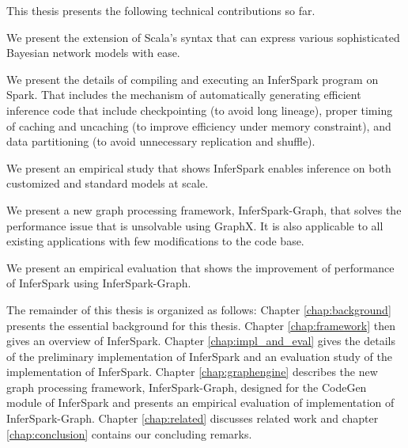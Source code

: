 This thesis presents the following technical contributions so far.
\begin{packed_enum}
\item We present the extension of Scala's syntax that can express various
	sophisticated Bayesian network models with ease.
\item We present the details of compiling and executing an InferSpark program
	on Spark.  That includes the mechanism of automatically generating efficient
	inference code that include checkpointing (to avoid long lineage), proper
	timing of caching and uncaching (to improve efficiency under memory
	constraint), and data partitioning (to avoid unnecessary replication and
	shuffle).
\item We present an empirical study that shows InferSpark enables inference
	on both customized and standard models at scale.
\item We present a new graph processing framework, InferSpark-Graph, that
	solves the performance issue that is unsolvable using GraphX. It is also
	applicable to all existing applications with few modifications to the code
	base.
\item We present an empirical evaluation that shows the improvement of
	performance of InferSpark using InferSpark-Graph.
\end{packed_enum}

The remainder of this thesis is organized as follows: 
Chapter \ref{chap:background} presents the essential background for this thesis.
Chapter \ref{chap:framework} then gives an overview of InferSpark.
Chapter \ref{chap:impl_and_eval} gives the details of the preliminary
implementation of InferSpark and an evaluation study of the implementation of
InferSpark.
Chapter \ref{chap:graphengine} describes the new graph processing framework,
InferSpark-Graph, designed for the CodeGen module of InferSpark and presents
an empirical evaluation of implementation of InferSpark-Graph.
Chapter \ref{chap:related} discusses related work
and chapter \ref{chap:conclusion} contains our concluding remarks.


